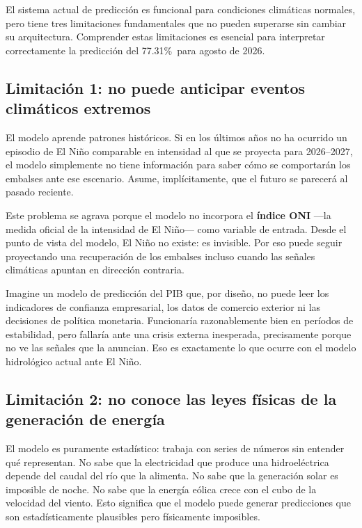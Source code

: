\documentclass[11pt,a4paper]{article}
\newcommand{\PREDAGOSTO}{77.31\%}
\begin{document}
El sistema actual de predicción es funcional para condiciones climáticas normales, pero tiene tres limitaciones fundamentales que no pueden superarse sin cambiar su arquitectura. Comprender estas limitaciones es esencial para interpretar correctamente la predicción del \PREDAGOSTO\ para agosto de 2026.

\subsection{Limitación 1: no puede anticipar eventos climáticos extremos}

El modelo aprende patrones históricos. Si en los últimos años no ha ocurrido un episodio de El Niño comparable en intensidad al que se proyecta para 2026--2027, el modelo simplemente no tiene información para saber cómo se comportarán los embalses ante ese escenario. Asume, implícitamente, que el futuro se parecerá al pasado reciente.

Este problema se agrava porque el modelo no incorpora el \textbf{índice ONI} —la medida oficial de la intensidad de El Niño— como variable de entrada. Desde el punto de vista del modelo, El Niño no existe: es invisible. Por eso puede seguir proyectando una recuperación de los embalses incluso cuando las señales climáticas apuntan en dirección contraria.

\begin{highlightbox}
Imagine un modelo de predicción del PIB que, por diseño, no puede leer los indicadores de confianza empresarial, los datos de comercio exterior ni las decisiones de política monetaria. Funcionaría razonablemente bien en períodos de estabilidad, pero fallaría ante una crisis externa inesperada, precisamente porque no ve las señales que la anuncian. Eso es exactamente lo que ocurre con el modelo hidrológico actual ante El Niño.
\end{highlightbox}

\subsection{Limitación 2: no conoce las leyes físicas de la generación de energía}

El modelo es puramente estadístico: trabaja con series de números sin entender qué representan. No sabe que la electricidad que produce una hidroeléctrica depende del caudal del río que la alimenta. No sabe que la generación solar es imposible de noche. No sabe que la energía eólica crece con el cubo de la velocidad del viento. Esto significa que el modelo puede generar predicciones que son estadísticamente plausibles pero físicamente imposibles.
\end{document}
